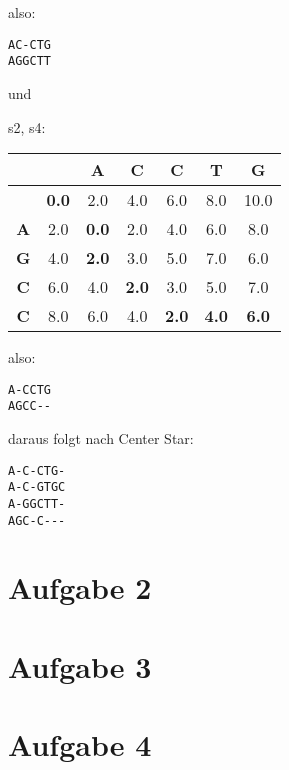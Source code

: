 \documentclass[a4paper,10pt,oneside,reqno]{scrartcl}
\begin{document}
also:
\begin{verbatim}
AC-CTG
AGGCTT
\end{verbatim}

und

s2, s4: \\
\begin{tabular}{c|cccccc}
& \textbf{ } & \textbf{A} & \textbf{C} & \textbf{C} & \textbf{T} & \textbf{G}\\\hline
\textbf{ } & \textbf{0.0} & 2.0 & 4.0 & 6.0 & 8.0 & 10.0\\
\textbf{A} & 2.0 & \textbf{0.0} & 2.0 & 4.0 & 6.0 & 8.0\\
\textbf{G} & 4.0 & \textbf{2.0} & 3.0 & 5.0 & 7.0 & 6.0\\
\textbf{C} & 6.0 & 4.0 & \textbf{2.0} & 3.0 & 5.0 & 7.0\\
\textbf{C} & 8.0 & 6.0 & 4.0 & \textbf{2.0} & \textbf{4.0} & \textbf{6.0}\\
\end{tabular}

also:
\begin{verbatim}
A-CCTG
AGCC--
\end{verbatim}

daraus folgt nach Center Star:

\begin{verbatim}
A-C-CTG-
A-C-GTGC
A-GGCTT-
AGC-C---
\end{verbatim}

\section*{Aufgabe 2}%

\section*{Aufgabe 3}%


\section*{Aufgabe 4}%
\end{document}

